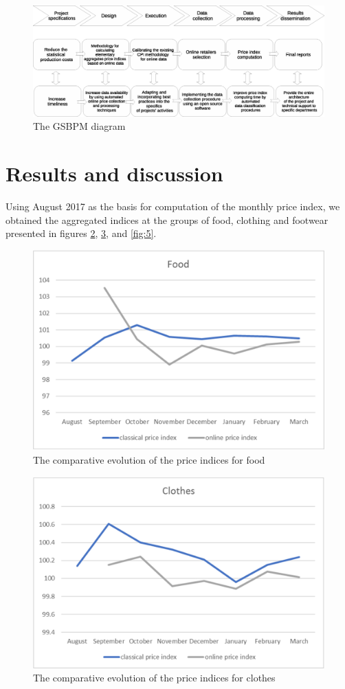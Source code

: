 \documentclass[]{article}
\begin{document}
\begin{figure}
\centering
\includegraphics[width=0.7\linewidth]{fig2.eps}
\caption{The GSBPM diagram}
\label{fig:2}
\end{figure}



\section{Results and discussion } \label{results}

Using August 2017 as the basis for computation of the monthly price index, we obtained the aggregated indices at the 
groups of food, clothing and footwear presented in figures \ref{fig:3}, \ref{fig:4}, and \ref{fig:5}.


\begin{figure}
\centering
\includegraphics[width=0.7\linewidth]{fig3.eps}
\caption{The comparative evolution of the price indices for food}
\label{fig:3}
\end{figure}


\begin{figure}
\centering
\includegraphics[width=0.7\linewidth]{fig4.eps}
\caption{The comparative evolution of the price indices for clothes}
\label{fig:4}
\end{figure}
\end{document}
